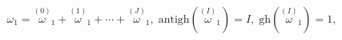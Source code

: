 \begin{equation}
\omega _{1}=\stackrel{(0)}{\omega }_{1}+\stackrel{(1)}{\omega }_{1}+\cdots +%
\stackrel{(J)}{\omega }_{1},\;\mathrm{antigh}\left( \stackrel{(I)}{\omega }%
_{1}\right) =I,\;\mathrm{gh}\left( \stackrel{(I)}{\omega }_{1}\right) =1,
\label{c2}
\end{equation}

